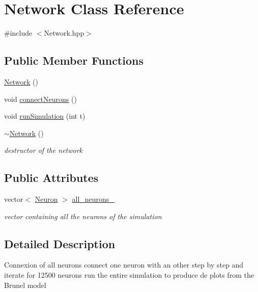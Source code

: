 \hypertarget{classNetwork}{\section{Network Class Reference}
\label{classNetwork}
}


{\ttfamily \#include $<$Network.\-hpp$>$}

\subsection*{Public Member Functions}
\begin{DoxyCompactItemize}
\item 
\hyperlink{classNetwork_a3cc2fb4f8fa4d507077e8da85ce5a1c8}{Network} ()
\item 
void \hyperlink{classNetwork_a03601b65392e7f6ad7092a129c68dc20}{connect\-Neurons} ()
\item 
void \hyperlink{classNetwork_aae5b9f51904fe64dee3c124bbf72ee87}{run\-Simulation} (int t)
\item 
\hypertarget{classNetwork_a7a4e19cdb4bf0c7ecf82baa643831492}{\hyperlink{classNetwork_a7a4e19cdb4bf0c7ecf82baa643831492}{$\sim$\-Network} ()}\label{classNetwork_a7a4e19cdb4bf0c7ecf82baa643831492}

\begin{DoxyCompactList}\small\item\em destructor of the network \end{DoxyCompactList}\end{DoxyCompactItemize}
\subsection*{Public Attributes}
\begin{DoxyCompactItemize}
\item 
\hypertarget{classNetwork_a5973d4c074365f2e87d942bdc637fe7c}{vector$<$ \hyperlink{classNeuron}{Neuron} $>$ \hyperlink{classNetwork_a5973d4c074365f2e87d942bdc637fe7c}{all\-\_\-neurons\-\_\-}}\label{classNetwork_a5973d4c074365f2e87d942bdc637fe7c}

\begin{DoxyCompactList}\small\item\em vector containing all the neurons of the simulation \end{DoxyCompactList}\end{DoxyCompactItemize}


\subsection{Detailed Description}
Connexion of all neurons connect one neuron with an other step by step and iterate for 12500 neurons run the entire simulation to produce de plots from the Brunel model 

